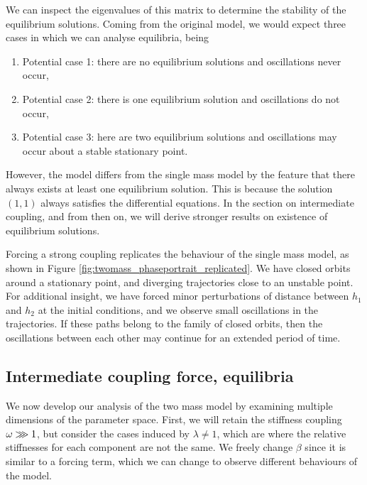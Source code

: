 \documentclass{report}
\begin{document}
We can inspect the eigenvalues of this matrix to determine the stability of the equilibrium solutions.
Coming from the original model, we would expect three cases in which we can analyse equilibria, being
\begin{enumerate}
    \item Potential case 1: there are no equilibrium solutions and oscillations never occur,
    \item Potential case 2: there is one equilibrium solution and oscillations do not occur,
    \item Potential case 3: here are two equilibrium solutions and oscillations may occur about a stable stationary point.
\end{enumerate}
However, the model differs from the single mass model by the feature that there always exists at least one equilibrium solution.
This is because the solution \((1,1)\) always satisfies the differential equations.
In the section on intermediate coupling, and from then on,
we will derive stronger results on existence of equilibrium solutions.

Forcing a strong coupling replicates the behaviour of the single mass model, as shown in Figure \ref{fig:twomass_phaseportrait_replicated}.
We have closed orbits around a stationary point,
and diverging trajectories close to an unstable point.
For additional insight,
we have forced minor perturbations of distance between $h_1$ and $h_2$ at the initial conditions,
and we observe small oscillations in the trajectories.
If these paths belong to the family of closed orbits, then the oscillations between each other may continue for an extended period of time.


\subsection{Intermediate coupling force, equilibria}

We now develop our analysis of the two mass model by examining multiple dimensions of the parameter space.
First, we will retain the stiffness coupling \(\omega \gggtr 1\),
but consider the cases induced by \(\lambda \ne 1\), which are where the relative stiffnesses for each component are not the same.
We freely change \(\beta\) since it is similar to a forcing term, which we can change to observe different behaviours of the model.

\end{document}
